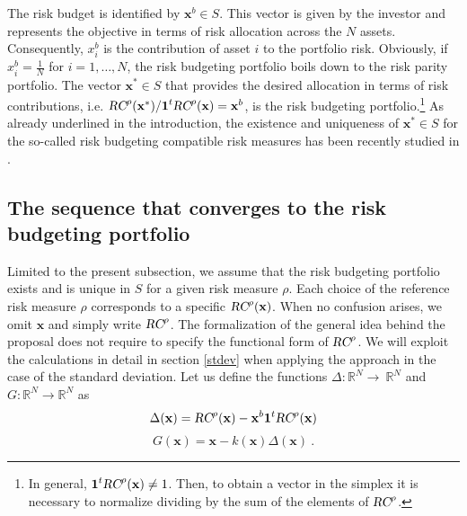 \documentclass[preprint,11pt,authoryear]{elsarticle}
\begin{document}
The risk budget is identified by $\mathbf{x}^b \in S$. This vector is given by the investor and represents the objective in terms of risk allocation across the $N$ assets. Consequently, ${x}^b_i$ is the contribution of asset $i$ to the portfolio risk. Obviously, if ${x}^b_i = \frac{1}{N}$ for $i = 1, \ldots, N$, the risk budgeting portfolio boils down to the risk parity portfolio. The vector $\mathbf{x}^* \in S$ that provides the desired allocation in terms of risk contributions, i.e. $\textsl{RC}^{\rho}(\mathbf{x}^*)/\boldsymbol{1}^t\textsl{RC}^{\rho}(\mathbf{x}) = \mathbf{x}^b$, is the risk budgeting portfolio.\footnote{In general, $\boldsymbol{1}^t\textsl{RC}^{\rho}(\mathbf{x}) \neq 1$. Then, to obtain a vector in the simplex it is necessary to normalize dividing by the sum of the elements of $\textsl{RC}^{\rho}$.} As already underlined in the introduction, the existence and uniqueness of $\mathbf{x}^* \in S$ for the so-called risk budgeting compatible risk measures has been recently studied in \cite{cetingoz2024risk}. 

\subsection{The sequence that converges to the risk budgeting portfolio}\label{fix_gen}

Limited to the present subsection, we assume that the risk budgeting portfolio exists and is unique in $S$ for a given risk measure $\rho$. Each choice of the reference risk measure $\rho$ corresponds to a specific $\textsl{RC}^{\rho}(\mathbf{x})$. When no confusion arises, we omit $\mathbf{x}$ and simply write $\textsl{RC}^{\rho}$. The formalization of the general idea behind the proposal does not require to specify the functional form of $\textsl{RC}^{\rho}$. We will exploit the calculations in detail in section \ref{stdev} when applying the approach in the case of the standard deviation. Let us define the functions $\Delta: \mathbb R^N \rightarrow \ \mathbb R^N$ and $G: \mathbb R^N \rightarrow \mathbb R^N$ as 
\begin{equation}
\Delta (\mathbf{x}) = \textsl{RC}^{\rho}(\mathbf{x})  - \mathbf{x}^b \textbf{1}^t \textsl{RC}^{\rho}(\mathbf{x})
\end{equation}
\begin{equation}\label{functionG}
G(\mathbf{x})=\mathbf{x} - k(\mathbf{x})\Delta (\mathbf{x} )\ .
\end{equation}
\end{document}
